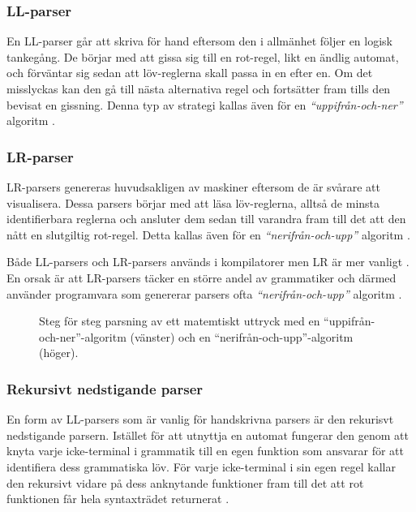 \subsubsection{LL-parser}

En LL-parser går att skriva för hand eftersom den i allmänhet följer en logisk
tankegång. De börjar med att gissa sig till en rot-regel, likt en ändlig
automat, och förväntar sig sedan att löv-reglerna skall passa in en efter en.
Om det misslyckas kan den gå till nästa alternativa regel och fortsätter
fram tills den bevisat en gissning. Denna typ av strategi kallas även för en
\textit{``uppifrån-och-ner''} algoritm \citep[s. 67]{sm09}.

\subsubsection{LR-parser}

LR-parsers genereras huvudsakligen av maskiner eftersom de är svårare att
visualisera. Dessa parsers börjar med att läsa löv-reglerna, alltså de minsta
identifierbara reglerna och ansluter dem sedan till varandra fram till det att
den nått en slutgiltig rot-regel. Detta kallas även för en
\textit{``nerifrån-och-upp''} algoritm \citep[s. 67]{sm09}.

Både LL-parsers och LR-parsers används i kompilatorer men LR är mer
vanligt \citep[s. 67]{sm09}. En orsak är att LR-parsers täcker en
större andel av grammatiker och därmed använder programvara som genererar
parsers ofta \textit{``nerifrån-och-upp''} algoritm \citep[s. 61]{aa06}.

\begin{figure}[ht]
  \begin{minipage}[t]{0.5\textwidth}
  \end{minipage}%
  \begin{minipage}[t]{0.5\textwidth}
  \end{minipage}%
  \caption{Steg för steg parsning av ett matemtiskt uttryck med en
    ``uppifrån-och-ner''-algoritm (vänster) och en
    ``nerifrån-och-upp''-algoritm (höger).}
  \label{fig:ll-vs-lr}
\end{figure}

\subsubsection{Rekursivt nedstigande parser}

En form av LL-parsers som är vanlig för handskrivna parsers är den rekurisvt
nedstigande parsern. Istället för att utnyttja en automat fungerar den genom
att knyta varje icke-terminal i grammatik till en egen funktion som ansvarar
för att identifiera dess grammatiska löv. För varje icke-terminal i sin egen
regel kallar den rekursivt vidare på dess anknytande funktioner fram till det
att rot funktionen får hela syntaxträdet returnerat \citep[s. 24]{pt10}.

